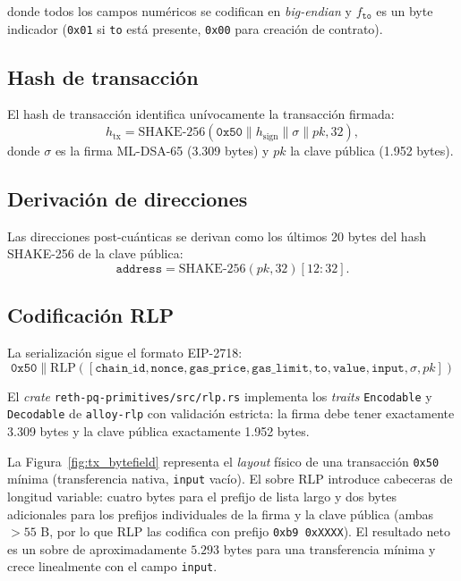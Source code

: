 donde todos los campos numéricos se codifican en \emph{big-endian} y $f_{\texttt{to}}$ es un byte indicador (\texttt{0x01} si \texttt{to} está presente, \texttt{0x00} para creación de contrato).

\subsection{Hash de transacción}

El hash de transacción identifica unívocamente la transacción firmada:
\begin{equation}
  h_{\text{tx}} = \text{SHAKE-256}(\texttt{0x50} \| h_{\text{sign}} \| \sigma \| \mathit{pk}, 32),
\end{equation}
donde $\sigma$ es la firma ML-DSA-65 (3.309 bytes) y $\mathit{pk}$ la clave pública (1.952 bytes).

\subsection{Derivación de direcciones}

Las direcciones post-cuánticas se derivan como los últimos 20 bytes del hash SHAKE-256 de la clave pública:
\begin{equation}
  \texttt{address} = \text{SHAKE-256}(\mathit{pk}, 32)[12{:}32].
  \label{eq:pq_address}
\end{equation}

\subsection{Codificación RLP}

La serialización sigue el formato EIP-2718:
\begin{equation}
  \texttt{0x50} \| \text{RLP}([\texttt{chain\_id}, \texttt{nonce}, \texttt{gas\_price}, \texttt{gas\_limit}, \texttt{to}, \texttt{value}, \texttt{input}, \sigma, \mathit{pk}])
\end{equation}

El \emph{crate} \texttt{reth-pq-primitives/src/rlp.rs} implementa los \emph{traits} \texttt{Encodable} y \texttt{Decodable} de \texttt{alloy-rlp} con validación estricta: la firma debe tener exactamente 3.309 bytes y la clave pública exactamente 1.952 bytes.

La Figura~\ref{fig:tx_bytefield} representa el \emph{layout} físico de una transacción \texttt{0x50} mínima (transferencia nativa, \texttt{input} vacío). El sobre RLP introduce cabeceras de longitud variable: cuatro bytes para el prefijo de lista largo y dos bytes adicionales para los prefijos individuales de la firma y la clave pública (ambas $> 55$ B, por lo que RLP las codifica con prefijo \texttt{0xb9 0xXXXX}). El resultado neto es un sobre de aproximadamente $5.293$ bytes para una transferencia mínima y crece linealmente con el campo \texttt{input}.


